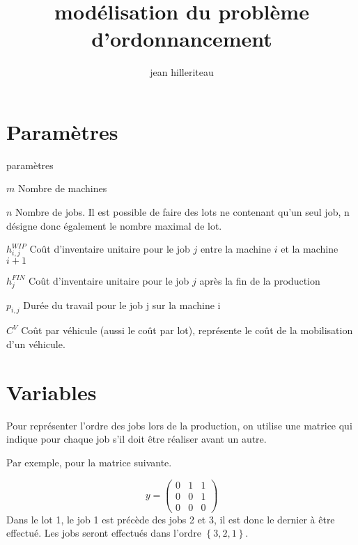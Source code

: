\documentclass{article}
\begin{document}
    \title{modélisation du problème d'ordonnancement}
    
    \author{jean hilleriteau}
    
    
    \section*{Paramètres}
        \begin{labeling}{paramètres}
        
            \item [$m$] Nombre de machines
            
            \item [$n$] Nombre de jobs. 
            Il est possible de faire des lots ne contenant qu’un seul job, 
            n désigne donc également le nombre maximal de lot.
            
            \item [$h_{i,j}^{WIP}$] Coût d’inventaire unitaire pour le job $j$ entre la machine $i$ et la machine $i+1$
            
            \item [$h_j^{FIN}$] Coût d’inventaire unitaire pour le job $j$ après la fin de la production
            
            \item [$p_{i,j}$] Durée du travail pour le job j sur la machine i
            
            \item [$C^V$] Coût par véhicule (aussi le coût par lot), représente le coût de la mobilisation d’un véhicule.
            
        \end{labeling}
    
    
    \section*{Variables}
    
        Pour représenter l’ordre des jobs lors de la production, on utilise une matrice qui indique pour chaque job s’il doit être réaliser avant un autre.
        
        Par exemple, pour la matrice suivante.

        $$
            y=
            \begin{pmatrix}
                0&1&1\\
                0&0&1\\
                0&0&0
            \end{pmatrix}
        $$
        Dans le lot 1, le job 1 est précède des jobs 2 et 3, il est donc le dernier à être effectué. Les jobs seront effectués dans l’ordre $\left\{3,2,1\right\}$.
        
\end{document}
